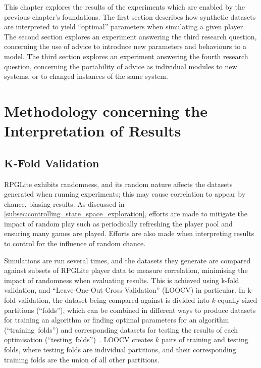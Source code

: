 This chapter explores the results of the experiments which are enabled by the
previous chapter's foundations.
The first section describes how synthetic datasets are interpreted to yield
``optimal'' parameters when simulating a given player.
The second section explores an experiment answering the third research question,
concerning the use of advice to introduce new parameters and behaviours to a model.
The third section explores an experiment answering the fourth research question,
concerning the portability of advice as individual modules to new systems, or to
changed instances of the same system.


\section{Methodology concerning the Interpretation of Results}
\label{methodology_explained}

\subsection{K-Fold Validation}
\label{k_fold_validation_explanation}

RPGLite exhibits randomness, and its random nature affects the datasets
generated when running experiments; this may cause correlation to appear by
chance, biasing results. As discussed in
\cref{subsec:controlling_state_space_exploration}, efforts are made to mitigate
the impact of random play such as periodically refreshing the player pool and
ensuring many games are played. Efforts are also made when interpreting results
to control for the influence of random chance.

Simulations are run several times, and the datasets they generate are compared
against subsets of RPGLite player data to measure correlation, minimising the
impact of randomness when evaluating results. This is achieved using k-fold
validation, and ``Leave-One-Out Cross-Validation'' (LOOCV) in particular. In
k-fold validation, the dataset being compared against is divided into $k$
equally sized partitions (``folds''), which can be combined in different ways to
produce datasets for training an algorithm or finding optimal parameters for an
algorithm (``training~folds'') and corresponding datasets for testing the
results of each optimisation
(``testing~folds'')~\cite{k-fold-validation-definition}. LOOCV creates $k$ pairs
of training and testing folds, where testing folds are individual partitions,
and their corresponding training folds are the union of all other partitions.

